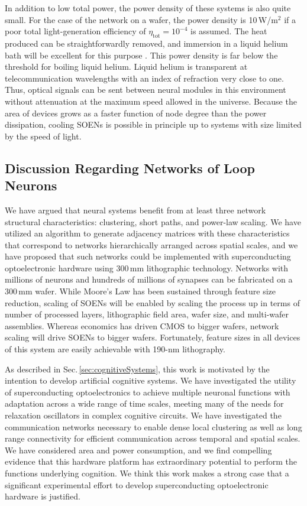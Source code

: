 \documentclass[aip,amsmath,amssymb,reprint,nofootinbib]{revtex4-1}
\begin{document}
In addition to low total power, the power density of these systems is also quite small. For the case of the network on a wafer, the power density is 10\,W/m$^2$ if a poor total light-generation efficiency of $\eta_{\mathrm{tot}} = 10^{-4}$ is assumed. The heat produced can be straightforwardly removed, and immersion in a liquid helium bath will be excellent for this purpose \cite{ek2006}. This power density is far below the threshold for boiling liquid helium. Liquid helium is transparent at telecommunication wavelengths with an index of refraction very close to one. Thus, optical signals can be sent between neural modules in this environment without attenuation at the maximum speed allowed in the universe. Because the area of devices grows as a faster function of node degree than the power dissipation, cooling SOENs is possible in principle up to systems with size limited by the speed of light.

\subsection{\label{sec:discussion_networks}Discussion Regarding Networks of Loop Neurons}
We have argued that neural systems benefit from at least three network structural characteristics: clustering, short paths, and power-law scaling. We have utilized an algorithm to generate adjacency matrices with these characteristics that correspond to networks hierarchically arranged across spatial scales, and we have proposed that such networks could be implemented with superconducting optoelectronic hardware using 300\,mm lithographic technology. Networks with millions of neurons and hundreds of millions of synapses can be fabricated on a 300\,mm wafer. While Moore's Law has been sustained through feature size reduction, scaling of SOENs will be enabled by scaling the process up in terms of number of processed layers, lithographic field area, wafer size, and multi-wafer assemblies. Whereas economics has driven CMOS to bigger wafers, network scaling will drive SOENs to bigger wafers. Fortunately, feature sizes in all devices of this system are easily achievable with 190-nm lithography.

As described in Sec.\,\ref{sec:cognitiveSystems}, this work is motivated by the intention to develop artificial cognitive systems. We have investigated the utility of superconducting optoelectronics to achieve multiple neuronal functions with adaptation across a wide range of time scales, meeting many of the needs for relaxation oscillators in complex cognitive circuits. We have investigated the communication networks necessary to enable dense local clustering as well as long range connectivity for efficient communication across temporal and spatial scales. We have considered area and power consumption, and we find compelling evidence that this hardware platform has extraordinary potential to perform the functions underlying cognition. We think this work makes a strong case that a significant experimental effort to develop superconducting optoelectronic hardware is justified.
\end{document}
